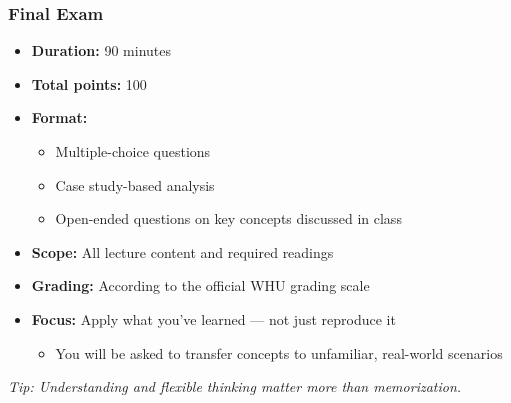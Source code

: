 \documentclass[aspectratio=169, 10pt]{beamer}
\begin{document}
\begin{frame}
\frametitle{Final Exam}

\begin{itemize}
  \item \textbf{Duration:} 90 minutes
  \item \textbf{Total points:} 100
  \item \textbf{Format:}
  \begin{itemize}
    \item Multiple-choice questions
    \item Case study-based analysis
    \item Open-ended questions on key concepts discussed in class
  \end{itemize}
  \item \textbf{Scope:} All lecture content and required readings
  \item \textbf{Grading:} According to the official WHU grading scale
  \item \textbf{Focus:} Apply what you’ve learned — not just reproduce it
  \begin{itemize}
    \item You will be asked to transfer concepts to unfamiliar, real-world scenarios
  \end{itemize}
\end{itemize}

\vspace{0.8em}
\centering
\textit{Tip: Understanding and flexible thinking matter more than memorization.}
\end{frame}
\end{document}

